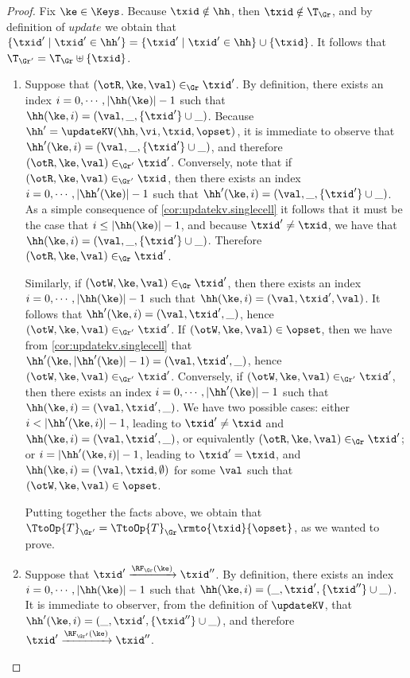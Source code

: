 \begin{proof}
Fix $\ke \in \Keys$. Because $\txid \notin \hh$, then $\txid \notin \T_{\Gr}$, 
and by definition of $update$ we obtain that $\{\txid' \mid \txid' \in \hh'\} = 
\{\txid' \mid \txid' \in \hh\} \cup \{\txid\}$. It follows that $\T_{\Gr'} = \T_{\Gr} \uplus \{\txid \}$.

\begin{enumerate}
\item Suppose that $(\otR, \ke, \val) \in_{\Gr} \txid'$. By definition, 
there exists an index $i = 0,\cdots, \lvert \hh(\ke) \rvert - 1$ such 
that $\hh(\ke, i) = (\val, \_, \{\txid'\} \cup \_)$. Because $\hh' = \updateKV(\hh, \vi, \txid, \opset)$, 
it is immediate to observe that $\hh'(\ke, i) = (\val, \_, \{\txid'\} \cup \_)$, and therefore 
$(\otR,\ke, \val) \in_{\Gr'} \txid'$. Conversely, note that if $(\otR, \ke, \val) \in_{\Gr'} \txid$, 
then there exists an index $i = 0,\cdots, \lvert \hh'(\ke) \rvert - 1$ such that 
$\hh'(\ke, i) = (\val, \_, \{\txid'\} \cup \_)$. As a simple consequence of \cref{cor:updatekv.singlecell} 
it follows that it must be the case that $i \leq \lvert \hh(\ke) \rvert - 1$, and because 
$\txid' \neq \txid$, we have that $\hh(\ke, i) = (\val, \_, \{\txid'\} \cup \_)$. Therefore 
$(\otR, \ke, \val) \in_{\Gr} \txid'$. 

Similarly, if $(\otW, \ke, \val) \in_{\Gr} \txid'$, 
then there exists an index $i=0,\cdots, \lvert \hh(\ke) \rvert - 1$ such that 
$\hh(\ke, i) = (\val, \txid', \val)$. It follows that $\hh'(\ke, i) = (\val, \txid', \_)$, hence 
$(\otW, \ke, \val) \in_{\Gr'} \txid'$. If $(\otW, \ke, \val) \in \opset$, then we 
have from \cref{cor:updatekv.singlecell} that $\hh'(\ke, \lvert \hh'(\ke) \rvert - 1) = (\val, \txid', \_)$, 
hence $(\otW, \ke, \val) \in_{\Gr'} \txid'$. 
Conversely, if $(\otW, \ke, \val) \in_{\Gr'} \txid'$, then there exists an index 
$i = 0, \cdots, \lvert \hh'(\ke) \rvert - 1$ such that $\hh(\ke, i) = (\val, \txid', \_)$. 
We have two possible cases: either $i < \lvert \hh'(\ke, i) \rvert - 1$, leading to  
$\txid' \neq \txid$ and $\hh(\ke, i) = (\val, \txid', \_)$, or equivalently 
$(\otR,\ke, \val) \in_{\Gr} \txid'$; or $i = \lvert \hh'(\ke, i) \rvert - 1$, 
leading to $\txid' = \txid$, and $\hh(\ke, i) = (\val, \txid, \emptyset)$ 
for some $\val$ such that $(\otW, \ke, \val) \in \opset$. 

Putting together the facts above, we obtain that $\TtoOp{T}_{\Gr'} = 
\TtoOp{T}_{\Gr}\rmto{\txid}{\opset}$, as we wanted to prove.

\item Suppose that $\txid' \xrightarrow{\RF_{\Gr}(\ke)} \txid''$. 
By definition, there exists an index $i = 0,\cdots, \lvert \hh(\ke) \rvert - 1$ 
such that $\hh(\ke, i) = (\_, \txid', \{\txid''\} \cup \_)$. It is immediate 
to observer, from the definition of $\updateKV$, that $\hh'(\ke, i) = (\_, \txid', \{\txid''\} \cup \_)$, 
and therefore $\txid' \xrightarrow{\RF_{\Gr'}(\ke)} \txid''$. 


\end{enumerate}
\end{proof}

